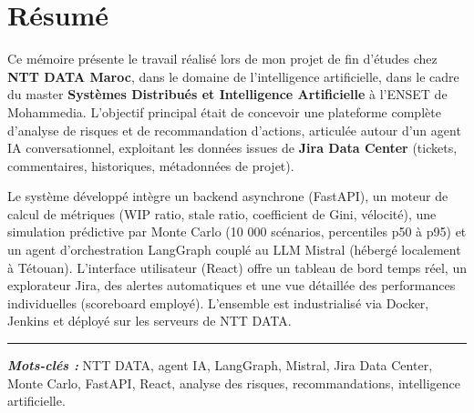 \chapter*{Résumé}
\vspace{-0.8cm}

Ce mémoire présente le travail réalisé lors de mon projet de fin d’études chez \textbf{NTT DATA Maroc}, dans le domaine de l’intelligence artificielle, dans le cadre du master \textbf{Systèmes Distribués et Intelligence Artificielle} à l’ENSET de Mohammedia. L’objectif principal était de concevoir une plateforme complète d’analyse de risques et de recommandation d’actions, articulée autour d’un agent IA conversationnel, exploitant les données issues de \textbf{Jira Data Center} (tickets, commentaires, historiques, métadonnées de projet).

Le système développé intègre un backend asynchrone (FastAPI), un moteur de calcul de métriques (WIP ratio, stale ratio, coefficient de Gini, vélocité), une simulation prédictive par Monte Carlo (10 000 scénarios, percentiles p50 à p95) et un agent d’orchestration LangGraph couplé au LLM Mistral (hébergé localement à Tétouan). L’interface utilisateur (React) offre un tableau de bord temps réel, un explorateur Jira, des alertes automatiques et une vue détaillée des performances individuelles (scoreboard employé). L’ensemble est industrialisé via Docker, Jenkins et déployé sur les serveurs de NTT DATA.

\vspace{2em}
\noindent\rule{\linewidth}{0.4pt}

\begin{flushright}
	\textbf{\textit{Mots-clés :}} NTT DATA, agent IA, LangGraph, Mistral, Jira Data Center, Monte Carlo, FastAPI, React, analyse des risques, recommandations, intelligence artificielle.
\end{flushright}